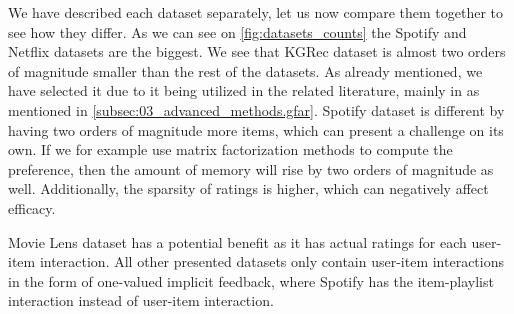 We have described each dataset separately, let us now compare them together to see how they differ. As we can see on \ref{fig:datasets_counts} the Spotify and Netflix datasets are the biggest. We see that KGRec dataset is almost two orders of magnitude smaller than the rest of the datasets. As already mentioned, we have selected it due to it being utilized in the related literature, mainly in \cite{GFAR-kaya2020} as mentioned in \ref{subsec:03_advanced_methods.gfar}. Spotify dataset is different by having two orders of magnitude more items, which can present a challenge on its own. If we for example use matrix factorization methods to compute the preference, then the amount of memory will rise by two orders of magnitude as well. Additionally, the sparsity of ratings is higher, which can negatively affect efficacy.

Movie Lens dataset has a potential benefit as it has actual ratings for each user-item interaction. All other presented datasets only contain user-item interactions in the form of one-valued implicit feedback, where Spotify has the item-playlist interaction instead of user-item interaction.

